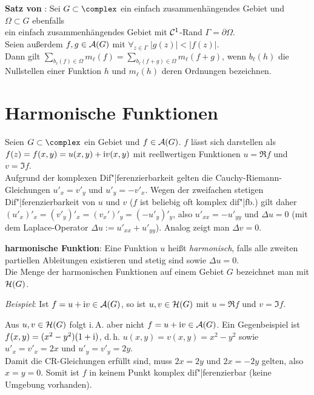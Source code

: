 \textbf{Satz von }:
Sei $G \subset \complex$ ein einfach zusammenhängendes Gebiet und
$\Omega \subset G$ ebenfalls\\
ein einfach zusammenhängendes Gebiet mit
$\mathcal{C}^1$-Rand $\Gamma = \partial \Omega$.\\
Seien außerdem $f, g \in \mathcal{A}(G)$ mit
$\forall_{z \in \Gamma}\; |g(z)| < |f(z)|$.\\
Dann gilt $\sum_{b_\ell(f) \in \Omega} m_\ell(f) =
\sum_{b_\ell(f + g) \in \Omega} m_\ell(f + g)$, wenn
$b_\ell(h)$ die Nullstellen einer Funktion $h$ und $m_\ell(h)$ deren Ordnungen
bezeichnen.

\section{%
    Harmonische Funktionen%
}

Seien $G \subset \complex$ ein Gebiet und $f \in \mathcal{A}(G)$.
$f$ lässt sich darstellen als\\
$f(z) = f(x, y) = u(x, y) + \mathrm{i} v(x, y)$ mit
reellwertigen Funktionen $u = \Re f$ und $v = \Im f$.\\
Aufgrund der komplexen Dif"|ferenzierbarkeit gelten die
Cauchy-Riemann-Gleichungen $u'_x = v'_y$ und $u'_y = -v'_x$.
Wegen der zweifachen stetigen Dif"|ferenzierbarkeit von $u$ und $v$
($f$ ist beliebig oft komplex dif"|fb.) gilt daher
$(u'_x)'_x = (v'_y)'_x = (v_x')'_y = (-u'_y)'_y$, also
$u'_{xx} = -u'_{yy}$ und $\Delta u = 0$
(mit dem Laplace-Operator $\Delta u := u'_{xx} + u'_{yy}$).
Analog zeigt man $\Delta v = 0$.

\textbf{harmonische Funktion}:
Eine Funktion $u$ heißt \emph{harmonisch},
falls alle zweiten partiellen Ableitungen
existieren und stetig sind sowie $\Delta u = 0$.\\
Die Menge der harmonischen Funktionen auf einem Gebiet $G$ bezeichnet man
mit $\mathcal{H}(G)$.

\emph{Beispiel}:
Ist $f = u + \mathrm{i} v \in \mathcal{A}(G)$, so ist $u, v \in \mathcal{H}(G)$ mit $u = \Re f$ und
$v = \Im f$.

Aus $u, v \in \mathcal{H}(G)$ folgt i.\,A. aber nicht $f = u + \mathrm{i} v \in \mathcal{A}(G)$.
Ein Gegenbeispiel ist\\
$f(x, y) = (x^2 - y^2) (1 + \mathrm{i})$, d.\,h.
$u(x, y) = v(x, y) = x^2 - y^2$ sowie
$u'_x = v'_x = 2x$ und $u'_y = v'_y = 2y$.\\
Damit die CR-Gleichungen erfüllt sind, muss $2x = 2y$ und
$2x = -2y$ gelten, also $x = y = 0$.
Somit ist $f$ in keinem Punkt komplex dif"|ferenzierbar
(keine Umgebung vorhanden).

